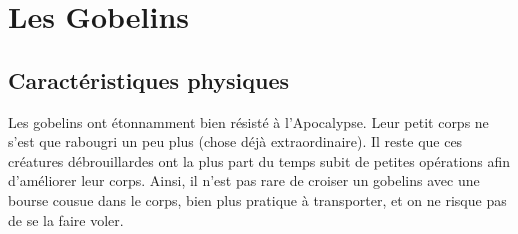 \section{Les Gobelins}
\subsection{Caractéristiques physiques}
Les gobelins ont étonnamment bien résisté à l'Apocalypse. Leur petit corps ne s'est que rabougri un peu plus (chose déjà extraordinaire). Il reste que ces créatures débrouillardes ont la plus part du temps subit de petites opérations afin d'améliorer leur corps. Ainsi, il n'est pas rare de croiser un gobelins avec une bourse cousue dans le corps, bien plus pratique à transporter, et on ne risque pas de se la faire voler. 
